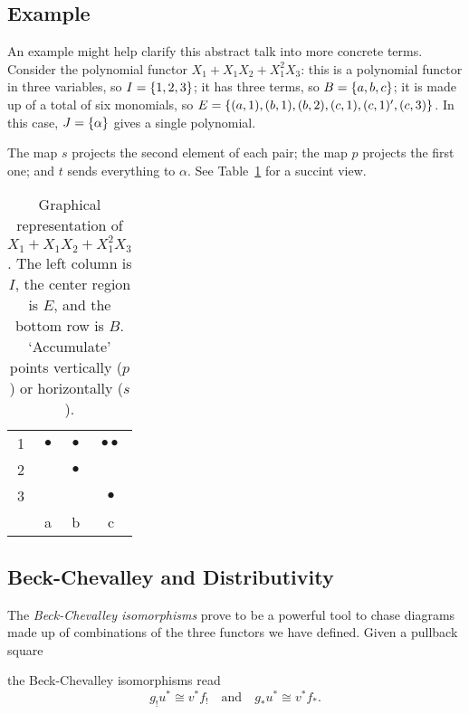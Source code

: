 \subsection{Example}

An example might help clarify this abstract talk into more concrete terms. Consider the polynomial functor $X_1+X_1X_2 + X_1^2X_3$: this is a polynomial functor in three variables, so $I=\{1,2,3\}$; it has three terms, so $B=\{a,b,c\}$; it is made up of a total of six monomials, so $E=\{(a,1), (b,1), (b,2), (c,1), (c,1)', (c,3)\}$. In this case, $J=\{\alpha\}$ gives a single polynomial.

The map $s$ projects the second element of each pair; the map $p$ projects the first one; and $t$ sends everything to $\alpha$. See Table~\ref{table:polyrep} for a succint view.
\begin{table}[]
\centering
\caption{Graphical representation of $X_1+X_1X_2+X_1^2X_3$. The left column is $I$, the center region is $E$, and the bottom row is $B$. `Accumulate' points vertically ($p$) or horizontally ($s$).}
\begin{tabular}{c|ccc}\label{table:polyrep}
1 & $\bullet$ & $\bullet$ & $\bullet\bullet$\\
2 &   & $\bullet$ &   \\
3 &   &   & $\bullet$ \\ \hline
  & a  & b  & c
\end{tabular}
\end{table}



\subsection{Beck-Chevalley and Distributivity}
The \emph{Beck-Chevalley isomorphisms} prove to be a powerful tool to chase diagrams made up of combinations of the three functors we have defined. Given a pullback square
\begin{center}
\end{center}
the Beck-Chevalley isomorphisms read
\begin{equation*}
  g_!u^* \cong v^*f_! \quad \text{and} \quad g_*u^* \cong v^*f_*.
\end{equation*}


